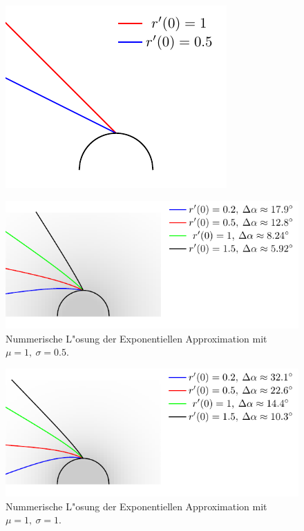 \begin{refsection}
\begin{figure}
\centering
\includegraphics[scale=1]{licht/standalone/fig_sphere_simulation_vacuum.pdf}
\end{figure}

\begin{figure}
\centering
\includegraphics[scale=1]{licht/standalone/fig_sphere_simulation1.pdf}
\caption{Nummerische L"osung der Exponentiellen Approximation mit $\mu = 1, \: \sigma = 0.5$. 
\label{fig:sphaerisches_modell2}}
\end{figure}

\begin{figure}
\centering
\includegraphics[scale=1]{licht/standalone/fig_sphere_simulation2.pdf}
\caption{Nummerische L"osung der Exponentiellen Approximation mit $\mu = 1, \: \sigma = 1$. \label{fig:sphaerisches_modell3} }
\end{figure}


\end{refsection}
